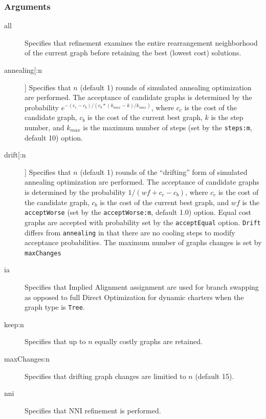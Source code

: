 	\subsubsection{Arguments}
		\begin{description}
			\item[all] Specifies that refinement examines the entire rearrangement neighborhood 
			of the current graph before retaining the best (lowest cost) solutions.
		
			\item[annealing[:n]] Specifies that $n$ (default 1) rounds of simulated annealing \citep{Metropolisetal1953, 
			Kirkpatricketal1983, Cerny1985} optimization are performed. The acceptance of candidate 
			graphs is determined by the probability $e ^ {- (c_c - c_b)/ (c_b * (k_{max} -k)/ k_{max})}$, 
			where $c_c$ is the cost of the candidate graph, $c_b$ is the cost of the current best graph, $k$ 
			is the step number, and $k_{max}$ is the maximum number of steps (set by the \texttt{steps:m}, 
			default 10) option.
		
			\item[drift[:n]] Specifies that $n$ (default 1) rounds of the ``drifting'' form of simulated annealing 
			\citep{goloboff1999} optimization are performed. The acceptance of candidate graphs is determined 
			by the probability $1/ (wf + c_c - c_b)$, where $c_c$ is the cost of the candidate graph, $c_b$ is 
			the cost of the current best graph, and $wf$ is the \texttt{acceptWorse} (set by the \texttt{acceptWorse:m}, 
			default 1.0) option. Equal cost graphs are accepted with probability set by the \texttt{acceptEqual} 
			option. \texttt{Drift} differs from \texttt{annealing} in that there are no cooling steps to modify acceptance 
			probabilities. The maximum number of graphs changes is set by \texttt{maxChanges}
		
			\item[ia] Specifies that Implied Alignment \citep{Wheeler2003} assignment are used for branch swapping 
			as opposed to full Direct Optimization for dynamic charters when the graph type is \texttt{Tree}.
		
			\item[keep:n] Specifies that up to $n$ equally costly graphs are retained.
		
			\item[maxChanges:n] Specifies that drifting graph changes are limitied to $n$ (default 15).
		
			\item[nni] Specifies that NNI refinement \citep{CaminandSokal1965, Robinson1971} is performed.
		

\end{description}
